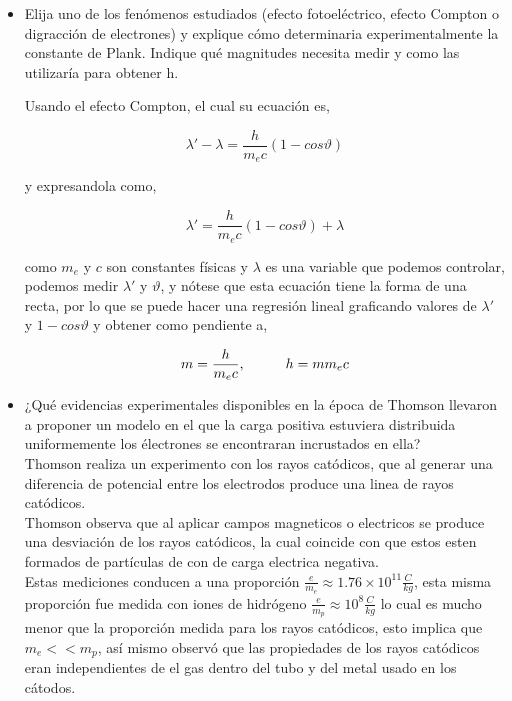 \documentclass[12pt,a4paper]{article}
\begin{document}
\begin{itemize}

\item Elija uno de los fenómenos estudiados (efecto fotoeléctrico, efecto Compton o digracción de electrones) y explique cómo determinaria experimentalmente la constante de Plank. Indique qué magnitudes necesita medir y como las utilizaría para obtener h.

Usando el efecto Compton, el cual su ecuación es, 

$$ \lambda' - \lambda = \frac{h}{m_e c}(1- cos\vartheta) $$

y expresandola como, 

$$ \lambda' = \frac{h}{m_e c}(1- cos\vartheta) +  \lambda $$

como $m_e$ y $c$ son constantes físicas y $\lambda$ es una variable que podemos controlar, podemos medir $\lambda'$ y $\vartheta$, y nótese que esta ecuación tiene la forma de una recta, por lo que se puede hacer una regresión lineal graficando valores de $\lambda'$ y $1-cos\vartheta$ y obtener como pendiente a, 

$$ m = \frac{h}{m_e c},  \hspace{1 cm} h = m m_e c$$


\item ¿Qué evidencias experimentales disponibles en la época de Thomson llevaron a proponer un modelo en el que la carga positiva estuviera distribuida uniformemente los électrones se encontraran incrustados en ella?\\

Thomson realiza un experimento con los rayos catódicos, que al generar una diferencia de potencial entre los electrodos produce una linea de rayos catódicos.\\

Thomson observa que al aplicar campos magneticos o electricos se produce una desviación de los rayos catódicos, la cual coincide con que estos esten formados de partículas de con de carga electrica negativa.\\

Estas mediciones conducen a una proporción $\frac{e}{m_e} \approx 1.76 \times 10^{11} \frac{C}{kg}$, esta misma proporción fue medida con iones de hidrógeno $\frac{e}{m_p} \approx 10^8 \frac{C}{kg}$ lo cual es mucho menor que la proporción medida para los rayos catódicos, esto implica que $m_e << m_p$, así mismo observó que las propiedades de los rayos catódicos eran independientes de el gas dentro del tubo y del metal usado en los cátodos.\\


\end{itemize}
\end{document}

